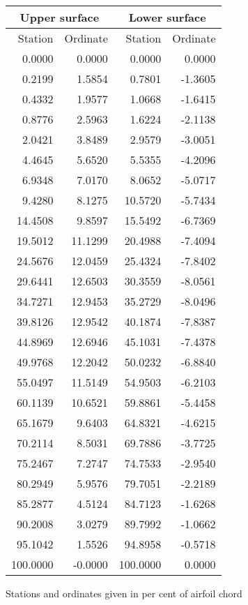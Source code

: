 \documentclass[11pt]{book}
\begin{document}
 \hspace{4mm}
 \begin{tabular}{|r|r|r|r|} \hline 
 \multicolumn{2}{|c|}{Upper surface} & \multicolumn{2}{|c|}{Lower surface} \\
 \hline
 Station & Ordinate & Station & Ordinate \\
 \hline
0.0000 & 0.0000 & 0.0000 & 0.0000 \\
0.2199 & 1.5854 & 0.7801 & -1.3605 \\
0.4332 & 1.9577 & 1.0668 & -1.6415 \\
0.8776 & 2.5963 & 1.6224 & -2.1138 \\
2.0421 & 3.8489 & 2.9579 & -3.0051 \\
4.4645 & 5.6520 & 5.5355 & -4.2096 \\
6.9348 & 7.0170 & 8.0652 & -5.0717 \\
9.4280 & 8.1275 & 10.5720 & -5.7434 \\
14.4508 & 9.8597 & 15.5492 & -6.7369 \\
19.5012 & 11.1299 & 20.4988 & -7.4094 \\
24.5676 & 12.0459 & 25.4324 & -7.8402 \\
29.6441 & 12.6503 & 30.3559 & -8.0561 \\
34.7271 & 12.9453 & 35.2729 & -8.0496 \\
39.8126 & 12.9542 & 40.1874 & -7.8387 \\
44.8969 & 12.6946 & 45.1031 & -7.4378 \\
49.9768 & 12.2042 & 50.0232 & -6.8840 \\
55.0497 & 11.5149 & 54.9503 & -6.2103 \\
60.1139 & 10.6521 & 59.8861 & -5.4458 \\
65.1679 & 9.6403 & 64.8321 & -4.6215 \\
70.2114 & 8.5031 & 69.7886 & -3.7725 \\
75.2467 & 7.2747 & 74.7533 & -2.9540 \\
80.2949 & 5.9576 & 79.7051 & -2.2189 \\
85.2877 & 4.5124 & 84.7123 & -1.6268 \\
90.2008 & 3.0279 & 89.7992 & -1.0662 \\
95.1042 & 1.5526 & 94.8958 & -0.5718 \\
100.0000 & -0.0000 & 100.0000 & 0.0000 \\
 \hline 
 \end{tabular}
 \vspace{8mm}

Stations and ordinates given in per cent of airfoil chord
\end{document}
